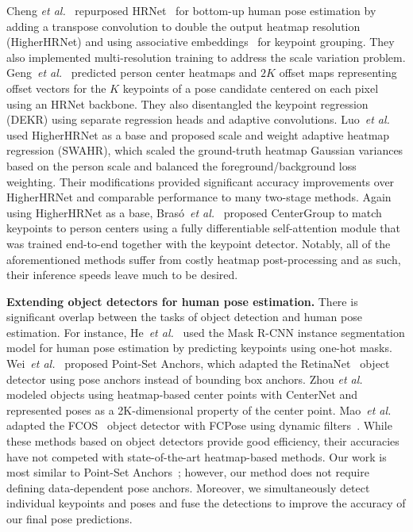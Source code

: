 \documentclass[runningheads]{llncs}
\newcommand{\etal}{\textit{et al.}}
\newcommand\hlll[1]{\bgroup
  \hskip0pt\color{black}#1\egroup
}
\begin{document}
Cheng \etal~\cite{cheng2020higherhrnet} repurposed HRNet~\cite{sun2019deep} for bottom-up human pose estimation by adding a transpose convolution to double the output heatmap resolution (HigherHRNet) and using associative embeddings~\cite{newell2017associative} for keypoint grouping. They also implemented multi-resolution training to address the scale variation problem.
Geng~\etal~\cite{geng2021bottom} predicted person center heatmaps and $2K$ offset maps representing offset vectors for the $K$ keypoints of a pose candidate centered on each pixel using an HRNet backbone. They also disentangled the keypoint regression (DEKR) using separate regression heads and adaptive convolutions.
Luo~\etal~\cite{luo2021rethinking} used HigherHRNet as a base and proposed scale and weight adaptive heatmap regression (SWAHR), which scaled the ground-truth heatmap Gaussian \hlll{variances} based on the person scale and balanced the foreground/background loss weighting. Their modifications provided significant accuracy improvements over HigherHRNet and comparable performance to many two-stage methods.
Again using HigherHRNet as a base, Bras\'{o}~\etal~\cite{braso2021center} proposed CenterGroup to match keypoints to person centers using a fully differentiable self-attention module that was trained end-to-end together with the keypoint detector. \hlll{Notably, all of the aforementioned methods} suffer from costly heatmap post-processing and as such, their inference speeds leave much to be desired.

\smallskip\noindent\textbf{Extending object detectors for human pose estimation.} There \hlll{is} significant overlap between the tasks of object detection and human pose estimation. For instance, He~\etal~\cite{he2017mask} used the Mask R-CNN instance segmentation model for human pose estimation by predicting keypoints using one-hot masks. Wei~\etal~\cite{wei2020point} proposed Point-Set Anchors, which adapted the RetinaNet~\cite{lin2017focal} object detector using pose anchors instead of bounding box anchors. Zhou \etal~\cite{zhou2019objects} modeled objects using heatmap-based center points with CenterNet and represented poses as a 2K-dimensional property of the center point. Mao~\etal~\cite{mao2021fcpose} adapted the FCOS~\cite{tian2019fcos} object detector with FCPose using dynamic filters~\cite{jia2016dynamic}. While these methods based on object detectors provide good efficiency, their accuracies have not competed with state-of-the-art heatmap-based methods. Our work is most similar \hlll{to} Point-Set Anchors~\cite{wei2020point}; however, our method does not require defining data-dependent pose anchors. Moreover, we simultaneously detect individual keypoints and poses and fuse the detections to improve the accuracy of our final pose predictions.
\end{document}

